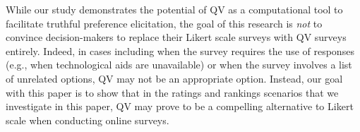 While our study demonstrates the potential of QV as a computational tool to facilitate truthful preference elicitation, the goal of this research is \textit{not} to convince decision-makers to replace their Likert scale surveys with QV surveys entirely. Indeed, in cases including when the survey requires the use of  responses (e.g., when technological aids are unavailable) or when the survey involves a list of unrelated options, QV may not be an appropriate option. Instead, our goal with this paper is to show that in the ratings and rankings scenarios that we investigate in this paper, QV may prove to be a compelling alternative to  Likert scale when conducting online surveys.  











